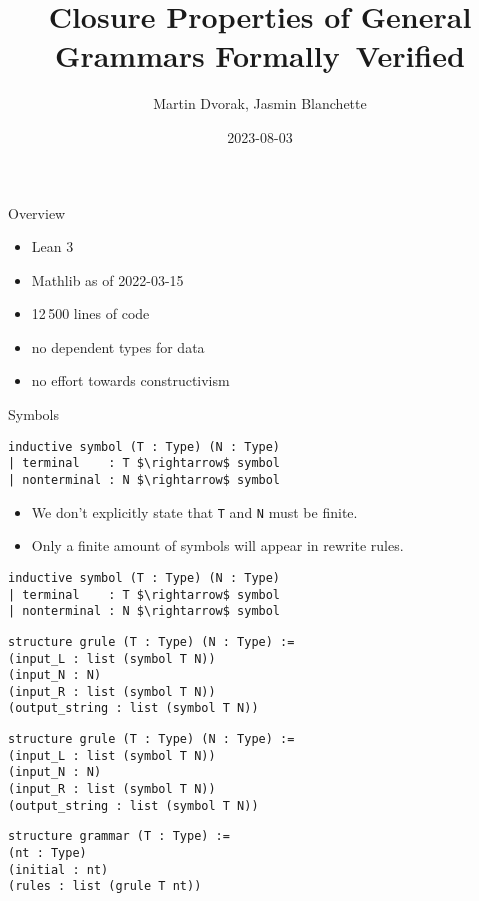 \documentclass{beamer}
\title{Closure Properties of General Grammars Formally~Verified}
\author{Martin Dvorak, Jasmin Blanchette}
\date{2023-08-03}
\begin{document}
	
	\begin{frame}[plain]
		\maketitle
	\end{frame}
	
	\begin{frame}{Overview}
		\begin{itemize}
			\item Lean 3
			\item Mathlib as of 2022-03-15
			\item 12\,500 lines of code
			\item no dependent types for data
			\item no effort towards constructivism
		\end{itemize}
	\end{frame}
	
	\begin{frame}[fragile]{Symbols}
\begin{lstlisting}
inductive symbol (T : Type) (N : Type)
| terminal    : T $\rightarrow$ symbol
| nonterminal : N $\rightarrow$ symbol
\end{lstlisting}
		\bigskip
		\pause
		\begin{itemize}
			\item We don't explicitly state that \texttt{T} and \texttt{N} must be finite.
			\item Only a finite amount of symbols will appear in rewrite rules.
		\end{itemize}
	\end{frame}

	\begin{frame}[fragile]{\only<2->{Rules}}
\begin{lstlisting}
inductive symbol (T : Type) (N : Type)
| terminal    : T $\rightarrow$ symbol
| nonterminal : N $\rightarrow$ symbol
\end{lstlisting}
\pause
\begin{lstlisting}
structure grule (T : Type) (N : Type) :=
(input_L : list (symbol T N))
(input_N : N)
(input_R : list (symbol T N))
(output_string : list (symbol T N))
\end{lstlisting}
	\end{frame}
	
	\begin{frame}[fragile]{\only<2->{Grammars}}
\begin{lstlisting}
structure grule (T : Type) (N : Type) :=
(input_L : list (symbol T N))
(input_N : N)
(input_R : list (symbol T N))
(output_string : list (symbol T N))
\end{lstlisting}
\pause
\begin{lstlisting}
structure grammar (T : Type) :=
(nt : Type)
(initial : nt)
(rules : list (grule T nt))
\end{lstlisting}
	\end{frame}
	
\end{document}
